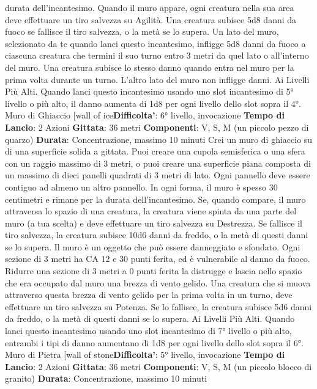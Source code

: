 \begin{multicols}{2}
durata dell’incantesimo.
Quando il muro appare, ogni creatura nella sua area
deve effettuare un tiro salvezza su Agilità. Una
creatura subisce 5d8 danni da fuoco se fallisce il tiro
salvezza, o la metà se lo supera.
Un lato del muro, selezionato da te quando lanci questo
incantesimo, infligge 5d8 danni da fuoco a ciascuna
creatura che termini il suo turno entro 3 metri da quel
lato o all’interno del muro. Una creatura subisce lo
stesso danno quando entra nel muro per la prima volta
durante un turno. L’altro lato del muro non infligge
danni.
Ai Livelli Più Alti. Quando lanci questo incantesimo
usando uno slot incantesimo di 5° livello o più alto, il
danno aumenta di 1d8 per ogni livello dello slot sopra il
4°.
Muro di Ghiaccio
[wall of ice\textbf{Difficolta'}:
6° livello, invocazione
\textbf{Tempo di Lancio}: 2 Azioni
\textbf{Gittata}: 36 metri
\textbf{Componenti}: V, S, M (un piccolo pezzo di quarzo)
\textbf{Durata}: Concentrazione, massimo 10 minuti
Crei un muro di ghiaccio su di una superficie solida a
gittata. Puoi creare una cupola semisferica o una sfera
con un raggio massimo di 3 metri, o puoi creare una
superficie piana composta di un massimo di dieci
panelli quadrati di 3 metri di lato. Ogni pannello deve
essere contiguo ad almeno un altro pannello. In ogni
forma, il muro è spesso 30 centimetri e rimane per la
durata dell’incantesimo.
Se, quando compare, il muro attraversa lo spazio di una
creatura, la creatura viene spinta da una parte del muro
(a tua scelta) e deve effettuare un tiro salvezza su
Destrezza. Se fallisce il tiro salvezza, la creatura
subisce 10d6 danni da freddo, o la metà di questi danni
se lo supera.
Il muro è un oggetto che può essere danneggiato e
sfondato. Ogni sezione di 3 metri ha CA 12 e 30 punti
ferita, ed è vulnerabile al danno da fuoco. Ridurre una
sezione di 3 metri a 0 punti ferita la distrugge e lascia
nello spazio che era occupato dal muro una brezza di
vento gelido. Una creatura che si muova attraverso
questa brezza di vento gelido per la prima volta in un
turno, deve effettuare un tiro salvezza su Potenza.
Se lo fallisce, la creatura subisce 5d6 danni da freddo,
o la metà di questi danni se lo supera.
Ai Livelli Più Alti. Quando lanci questo incantesimo
usando uno slot incantesimo di 7° livello o più alto,
entrambi i tipi di danno aumentano di 1d8 per ogni
livello dello slot sopra il 6°.
Muro di Pietra
[wall of stone\textbf{Difficolta'}:
5° livello, invocazione
\textbf{Tempo di Lancio}: 2 Azioni
\textbf{Gittata}: 36 metri
\textbf{Componenti}: V, S, M (un piccolo blocco di granito)
\textbf{Durata}: Concentrazione, massimo 10 minuti

\end{multicols}
